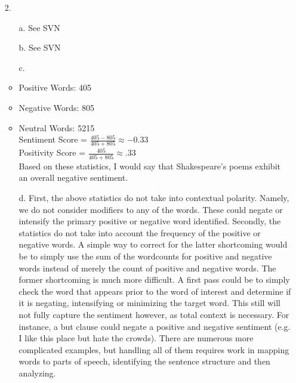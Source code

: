 \documentclass{article}
\begin{document}
\begin{itemize}
\item[2.]
	\begin{itemize}
	\item[a.] See SVN
	\item[b.] See SVN
	\item[c.] 
		\item Positive Words: 405
		\item Negative Words: 805
		\item Neutral Words: 5215\\	
		Sentiment Score = $\frac{405-805}{405+805} \approx -0.33$ \\
		Positivity Score = $\frac{405}{405+805} \approx .33$ \\
		Based on these statistics, I would say that Shakespeare's poems exhibit an overall negative sentiment.
	\item[d.] First, the above statistics do not take into contextual polarity. Namely, we do not consider modifiers to any of the words. These could negate or intensify the primary positive or negative word identified. Secondly, the statistics do not take into account the frequency of the positive or negative words. A simple way to correct for the latter shortcoming would be to simply use the sum of the wordcounts for positive and negative words instead of merely the count of positive and negative words. The former shortcoming is much more difficult. A first pass could be to simply check the word that appears prior to the word of interest and determine if it is negating, intensifying or minimizing the target word. This still will not fully capture the sentiment however, as total context is necessary. For instance, a but clause could negate a positive and negative sentiment (e.g. I like this place but hate the crowds). There are numerous more complicated examples, but handling all of them requires work in mapping words to parts of speech, identifying the sentence structure and then analyzing.
	
	\end{itemize}		
	
\end{itemize}
\end{document}
